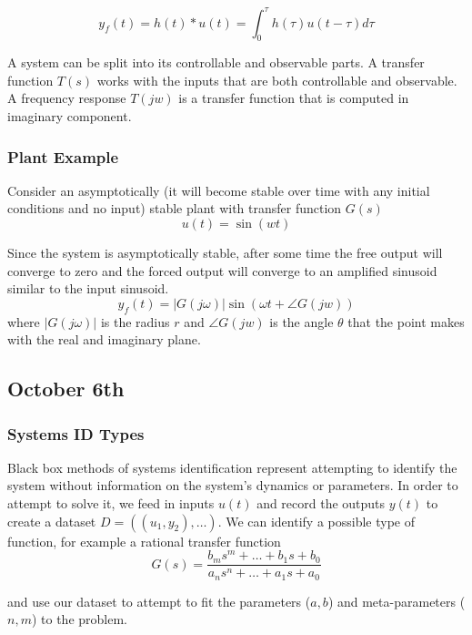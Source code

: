 \documentclass[11pt]{article}
\begin{document}
\begin{equation}
    y_f(t) = h(t) \ast u(t) = \int_{0}^{\tau} h(\tau) u(t-\tau) d \tau
\end{equation}

A system can be split into its controllable and observable parts.
A transfer function $T(s)$ works with the inputs that are both controllable and observable.
A frequency response $T(jw)$ is a transfer function that is computed in imaginary component.

\subsubsection{Plant Example}
Consider an asymptotically (it will become stable over time with any initial conditions and no input) stable plant with transfer function $G(s)$
\begin{equation}
    u(t) = \sin (wt)
\end{equation}

Since the system is asymptotically stable, after some time the free output will converge to zero and the forced output will converge to an amplified sinusoid similar to the input sinusoid.
\begin{equation}
    y_f (t) = |G(j \omega)| \sin (\omega t + \angle G(jw))
\end{equation}
where $|G(j \omega)|$ is the radius $r$ and $\angle G(jw)$ is the angle $\theta$ that the point makes with the real and imaginary plane.

\subsection{October 6th}

\subsubsection{Systems ID Types}
Black box methods of systems identification represent attempting to identify the system without information on the system's dynamics or parameters.
In order to attempt to solve it, we feed in inputs $u(t)$ and record the outputs $y(t)$ to create a dataset $D=((u_1, y_2), \dots)$.
We can identify a possible type of function, for example a rational transfer function 
\begin{equation}
    G(s) = \frac{b_m s^m + \dots + b_1 s + b_0}{a_n s^n + \dots + a_1 s + a_0}
\end{equation}

and use our dataset to attempt to fit the parameters ($a,b$) and meta-parameters ($n,m$) to the problem.
\end{document}
